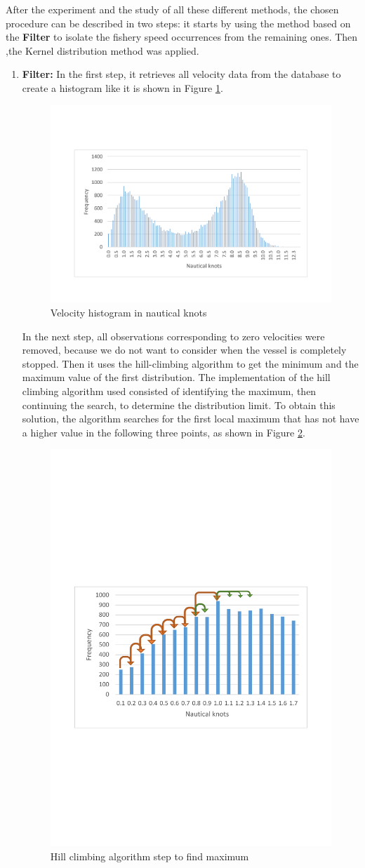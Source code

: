 After the experiment and the study of all these different methods, the chosen procedure can be described in two steps: it starts by using the method based on the \textbf{Filter} to isolate the fishery speed occurrences from the remaining ones. Then ,the Kernel distribution method was applied.
\begin{enumerate}
\item \textbf{Filter:} In the first step, it retrieves all velocity data from the database to create a histogram like it is shown in Figure \ref{fig:app_b_1}.

\begin{figure}
    \centering
    \includegraphics[trim=0 80 0 80,height=0.45\linewidth]{Chapters/img/hist_vessel2.pdf}
    \caption{Velocity histogram in nautical knots}
    \label{fig:app_b_1}
\end{figure}

In the next step, all observations corresponding to zero velocities were removed, because we do not want to consider when the vessel is completely stopped. Then it uses the hill-climbing algorithm to get the minimum and the maximum value of the first distribution. 
The implementation of the hill climbing algorithm used consisted of identifying the maximum, then continuing the search, to determine the distribution limit.
To obtain this solution, the algorithm searches for the first local maximum that has not have a higher value in the following three points, as shown in Figure \ref{fig:app_b_3}.



\begin{figure}
    \centering
    \includegraphics[trim=300 250 300 300,height=0.5\linewidth]{Chapters/img/hc_3.pdf}
    \caption{Hill climbing algorithm step to find maximum}
    \label{fig:app_b_3}
\end{figure}


\end{enumerate}
